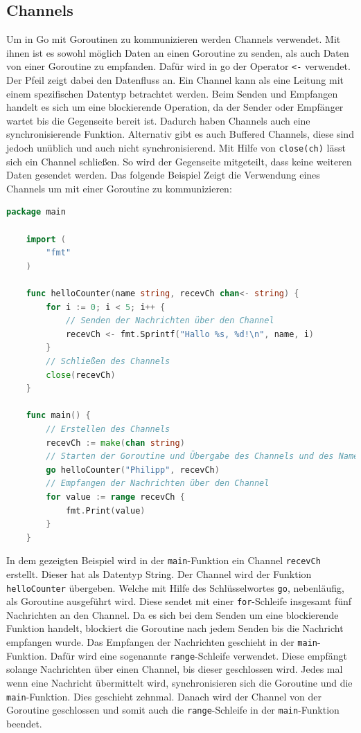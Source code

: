 \documentclass[fontsize=12pt,paper=a4,twoside=semi,parskip=half-,headsepline,headinclude]{scrreprt}
\begin{document}
\subsection{Channels}
\label{subsec:channel}

Um in Go mit Goroutinen zu kommunizieren werden Channels\cite{donovan2015} verwendet. Mit ihnen ist es sowohl möglich Daten an einen Goroutine zu senden, als auch Daten von einer Goroutine zu empfanden. Dafür wird in go der Operator \texttt{<-} verwendet. Der Pfeil zeigt dabei den Datenfluss an. Ein Channel kann als eine Leitung mit einem spezifischen Datentyp betrachtet werden. Beim Senden und Empfangen handelt es sich um eine blockierende Operation, da der Sender oder Empfänger wartet bis die Gegenseite bereit ist. Dadurch haben Channels auch eine synchronisierende Funktion. Alternativ gibt es auch Buffered Channels, diese sind jedoch unüblich und auch nicht synchronisierend. Mit Hilfe von \texttt{close(ch)} lässt sich ein Channel schließen. So wird der Gegenseite mitgeteilt, dass keine weiteren Daten gesendet werden. Das folgende Beispiel Zeigt die Verwendung eines Channels um mit einer Goroutine zu kommunizieren:

\begin{lstlisting}[language=Go,extendedchars=true]
	package main

	import (
		"fmt"
	)

	func helloCounter(name string, recevCh chan<- string) {
		for i := 0; i < 5; i++ {
			// Senden der Nachrichten über den Channel
			recevCh <- fmt.Sprintf("Hallo %s, %d!\n", name, i)
		}
		// Schließen des Channels
		close(recevCh)
	}

	func main() {
		// Erstellen des Channels
		recevCh := make(chan string)
		// Starten der Goroutine und Übergabe des Channels und des Namens
		go helloCounter("Philipp", recevCh)
		// Empfangen der Nachrichten über den Channel
		for value := range recevCh {
			fmt.Print(value)
		}
	}
\end{lstlisting}

In dem gezeigten Beispiel wird in der \texttt{main}-Funktion ein Channel \texttt{recevCh} erstellt. Dieser hat als Datentyp String. Der Channel wird der Funktion \texttt{helloCounter} übergeben. Welche mit Hilfe des Schlüsselwortes \texttt{go}, nebenläufig, als Goroutine ausgeführt wird. Diese sendet mit einer \texttt{for}-Schleife insgesamt fünf Nachrichten an den Channel. Da es sich bei dem Senden um eine blockierende Funktion handelt, blockiert die Goroutine nach jedem Senden bis die Nachricht empfangen wurde. Das Empfangen der Nachrichten geschieht in der \texttt{main}-Funktion. Dafür wird eine sogenannte \texttt{range}-Schleife verwendet. Diese empfängt solange Nachrichten über einen Channel, bis dieser geschlossen wird.  Jedes mal wenn eine Nachricht übermittelt wird, synchronisieren sich die Goroutine und die \texttt{main}-Funktion. Dies geschieht zehnmal. Danach wird der Channel von der Goroutine geschlossen und somit auch die \texttt{range}-Schleife in der \texttt{main}-Funktion beendet.
\end{document}
